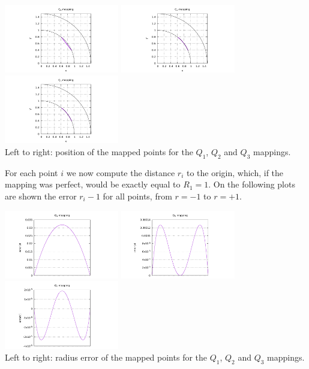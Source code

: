 \begin{center}
\includegraphics[width=5cm]{images/mappings/curved/xy1.pdf}
\includegraphics[width=5cm]{images/mappings/curved/xy2.pdf}
\includegraphics[width=5cm]{images/mappings/curved/xy3.pdf}\\
{\captionfont Left to right: position of the mapped points for the $Q_1$, $Q_2$ and $Q_3$ mappings.}
\end{center}

For each point $i$ we now compute the distance $r_i$ 
to the origin, which, if the 
mapping was perfect, would be exactly equal to $R_1=1$. 
On the following plots are shown the error $r_i-1$ for all 
points, from $r=-1$ to $r=+1$.

\begin{center}
\includegraphics[width=5cm]{images/mappings/curved/innerline_error_Q1mapping.pdf}
\includegraphics[width=5cm]{images/mappings/curved/innerline_error_Q2mapping.pdf}
\includegraphics[width=5cm]{images/mappings/curved/innerline_error_Q3mapping.pdf}\\
{\captionfont Left to right: radius error of the mapped points for the $Q_1$, $Q_2$ and $Q_3$ mappings.}
\end{center}

